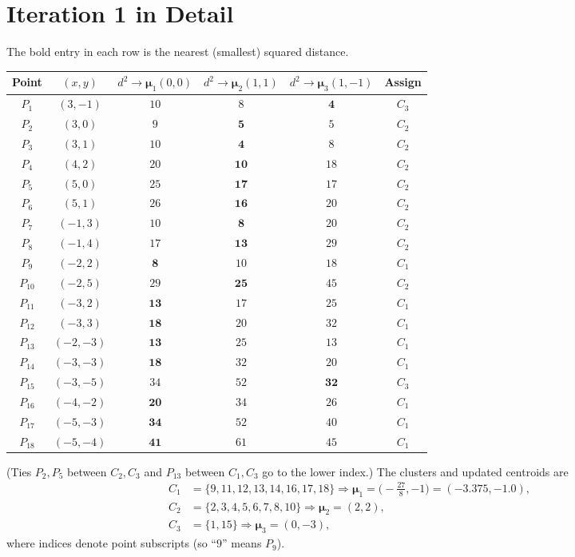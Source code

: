 \documentclass[11pt,a4paper]{report}
\theoremstyle{definition}
\theoremstyle{plain}
\theoremstyle{remark}
\newcommand{\vmu}{\bm{\mu}}
\begin{document}
	\section{Iteration 1 in Detail}
	The bold entry in each row is the nearest (smallest) squared distance.
	\begin{center}
	\small
	\begin{tabular}{@{}ccccc c@{}}
	\toprule
	Point & $(x,y)$ & $d^2\!\to\vmu_1(0,0)$ & $d^2\!\to\vmu_2(1,1)$ & $d^2\!\to\vmu_3(1,{-}1)$ & Assign\\
	\midrule
	$P_1$ & $(3,-1)$ & $10$ & $8$ & $\mathbf{4}$ & $C_3$\\
	$P_2$ & $(3,0)$ & $9$ & $\mathbf{5}$ & $5$ & $C_2$\\
	$P_3$ & $(3,1)$ & $10$ & $\mathbf{4}$ & $8$ & $C_2$\\
	$P_4$ & $(4,2)$ & $20$ & $\mathbf{10}$ & $18$ & $C_2$\\
	$P_5$ & $(5,0)$ & $25$ & $\mathbf{17}$ & $17$ & $C_2$\\
	$P_6$ & $(5,1)$ & $26$ & $\mathbf{16}$ & $20$ & $C_2$\\
	$P_7$ & $(-1,3)$ & $10$ & $\mathbf{8}$ & $20$ & $C_2$\\
	$P_8$ & $(-1,4)$ & $17$ & $\mathbf{13}$ & $29$ & $C_2$\\
	$P_9$ & $(-2,2)$ & $\mathbf{8}$ & $10$ & $18$ & $C_1$\\
	$P_{10}$ & $(-2,5)$ & $29$ & $\mathbf{25}$ & $45$ & $C_2$\\
	$P_{11}$ & $(-3,2)$ & $\mathbf{13}$ & $17$ & $25$ & $C_1$\\
	$P_{12}$ & $(-3,3)$ & $\mathbf{18}$ & $20$ & $32$ & $C_1$\\
	$P_{13}$ & $(-2,-3)$ & $\mathbf{13}$ & $25$ & $13$ & $C_1$\\
	$P_{14}$ & $(-3,-3)$ & $\mathbf{18}$ & $32$ & $20$ & $C_1$\\
	$P_{15}$ & $(-3,-5)$ & $34$ & $52$ & $\mathbf{32}$ & $C_3$\\
	$P_{16}$ & $(-4,-2)$ & $\mathbf{20}$ & $34$ & $26$ & $C_1$\\
	$P_{17}$ & $(-5,-3)$ & $\mathbf{34}$ & $52$ & $40$ & $C_1$\\
	$P_{18}$ & $(-5,-4)$ & $\mathbf{41}$ & $61$ & $45$ & $C_1$\\
	\bottomrule
	\end{tabular}
	\end{center}
	(Ties $P_2,P_5$ between $C_2,C_3$ and $P_{13}$ between $C_1,C_3$ go to the lower
	index.) The clusters and updated centroids are
	\[
	\begin{aligned}
	C_1&=\{9,11,12,13,14,16,17,18\}\Rightarrow \vmu_1=\bigl(-\tfrac{27}{8},-1\bigr)=(-3.375,-1.0),\\
	C_2&=\{2,3,4,5,6,7,8,10\}\Rightarrow \vmu_2=(2,2),\\
	C_3&=\{1,15\}\Rightarrow \vmu_3=(0,-3),
	\end{aligned}
	\]
	where indices denote point subscripts (so ``$9$'' means $P_9$).
	
\end{document}
